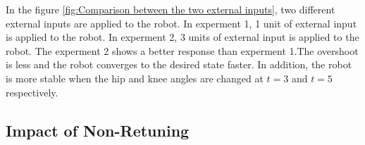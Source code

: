 In the figure \ref{fig:Comparison between the two external inputs}, two different external inputs are applied to the robot. In experment 1, 1 unit of external input is applied to the robot. In experment 2, 3 units of external input is applied to the robot. The experment 2 shows a better response than experment 1.The overshoot is less and the robot converges to the desired state faster. In addition, the robot is more stable when the hip and knee angles are changed at $t=3$ and $t=5$ respectively.
\newpage
\subsection{Impact of Non-Retuning}
